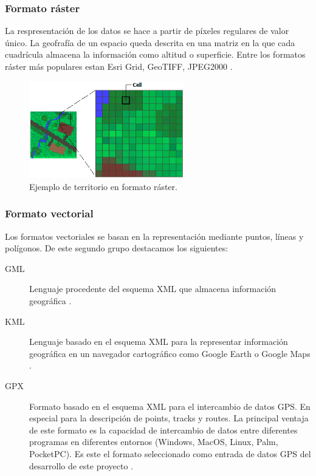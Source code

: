 \subsubsection{Formato ráster}
La respresentación de los datos se hace a partir de píxeles regulares de valor único.
La geofrafía de un espacio queda descrita en una matriz en la que cada cuadrícula 
almacena la información como altitud o superficie. Entre los formatos ráster más 
populares estan Esri Grid, GeoTIFF, JPEG2000 \cite{Morales01}.

\begin{figure}[htb]
\begin{center}
\includegraphics[width=0.6\textwidth]{./Imagenes/RasterImage.png}
\caption{Ejemplo de territorio en formato ráster. \cite{ArgGis01}}
\label{fig:PointGeneration02}
\end{center}
\end{figure}

\subsubsection{Formato vectorial}
Los formatos vectoriales se basan en la representación mediante puntos, líneas y polígonos.
De este segundo grupo destacamos los siguientes:
\begin{description}
\item [\ac{GML}] Lenguaje procedente del esquema \ac{XML} que almacena información geográfica \cite{OGC01}.
\item[\ac{KML}] Lenguaje basado en el esquema \ac{XML} para la representar información 
geográfica en un navegador cartográfico como Google Earth o Google Maps \cite{OGC02}.%
\item[\ac{GPX}]Formato basado en el esquema \ac{XML} para el intercambio de datos \ac{GPS}. 
En especial para la descripción de points, tracks y routes. La principal ventaja  de este formato 
es la capacidad de intercambio de datos entre diferentes  programas en diferentes entornos 
(Windows, MacOS, Linux, Palm, PocketPC). Es este el formato seleccionado como entrada de datos 
\ac{GPS} del desarrollo de este proyecto \cite{Topografix01}.
\end{description}


